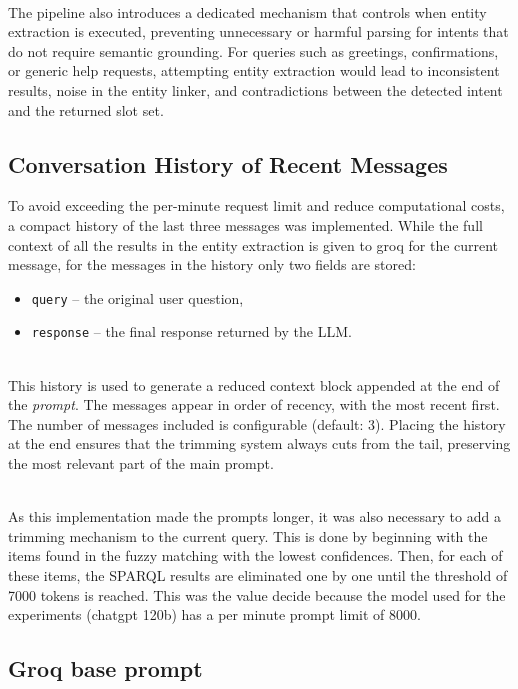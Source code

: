 \documentclass{article}
\begin{document}
\noindent
\\
The pipeline also introduces a dedicated mechanism that controls when entity extraction is executed, preventing unnecessary or harmful parsing for intents that do not require semantic grounding. For queries such as greetings, confirmations, or generic help requests, attempting entity extraction would lead to inconsistent results, noise in the entity linker, and contradictions between the detected intent and the returned slot set.




\subsection*{Conversation History of Recent Messages}

To avoid exceeding the per-minute request limit and reduce computational costs, a compact history of the last three messages was implemented. While the full context of all the results in the entity extraction is given to groq for the current message, for the messages in the history only two fields are stored:

\begin{itemize}
    \item \verb|query| – the original user question,
    \item \verb|response| – the final response returned by the LLM.
\end{itemize}

\noindent
\\
This history is used to generate a reduced context block appended at the end of the \textit{prompt}. The messages appear in order of recency, with the most recent first. The number of messages included is configurable (default: 3). Placing the history at the end ensures that the trimming system always cuts from the tail, preserving the most relevant part of the main prompt.

\noindent
\\
As this implementation made the prompts longer, it was also necessary to add a trimming mechanism to the current query. This is done by beginning with the items found in the fuzzy matching with the lowest confidences. Then, for each of these items, the SPARQL results are eliminated one by one until the threshold of 7000 tokens is reached. This was the value decide because the model used for the experiments (chatgpt 120b) \cite{gpt_oss_120b_hf} has a per minute prompt limit of 8000. 


\subsection{Groq base prompt}
\end{document}
